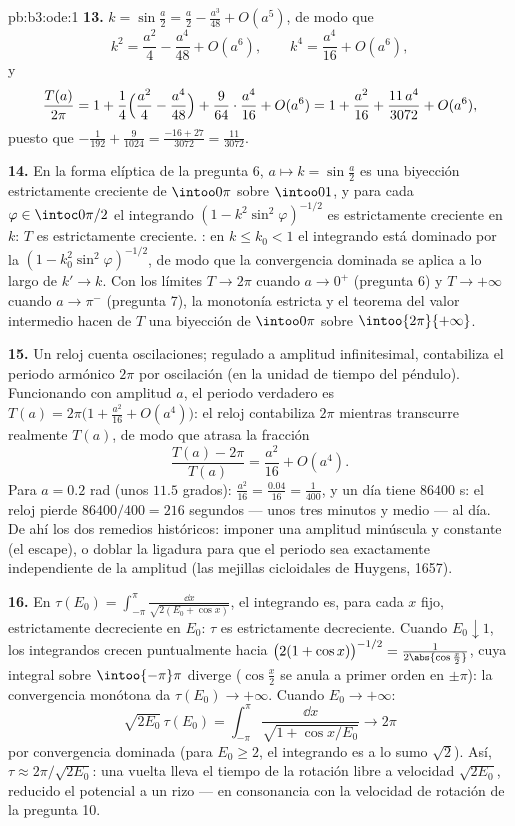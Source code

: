 \begin{solution}{pb:b3:ode:1}
\textbf{13.} $k = \sin\frac a2 = \frac a2 - \frac{a^3}{48} +
O(a^5)$, de modo que
\[
k^2 = \frac{a^2}4 - \frac{a^4}{48} + O(a^6),
\qquad
k^4 = \frac{a^4}{16} + O(a^6) ,
\]
y
\[
\frac{T(a)}{2\pi} = 1 + \frac14\Bigl(\frac{a^2}4 -
\frac{a^4}{48}\Bigr) + \frac9{64}\cdot\frac{a^4}{16} +
O(a^6)
= 1 + \frac{a^2}{16} + \frac{11\,a^4}{3072} + O(a^6) ,
\]
puesto que $-\frac1{192} + \frac9{1024} = \frac{-16 + 27}{3072}
= \frac{11}{3072}$.

\textbf{14.} En la forma elíptica de la pregunta 6, $a \mapsto
k = \sin\frac a2$ es una biyección
 estrictamente creciente de
$\intoo0\pi$ sobre $\intoo01$, y para cada $\varphi \in \intoc0{\pi/2}$
el integrando $(1 -
k^2\sin^2\varphi)^{-1/2}$ es estrictamente creciente en $k$: $T$ es
estrictamente creciente.
: en $k \leq k_0 < 1$ el
integrando está dominado por la
 $(1 -
k_0^2\sin^2\varphi)^{-1/2}$, de modo que la convergencia dominada se
aplica a lo largo de $k' \to k$. Con los límites $T \to 2\pi$ cuando $a
\to 0^+$ (pregunta 6) y $T \to +\infty$ cuando $a \to \pi^-$ (pregunta
7), la monotonía estricta y el teorema del valor intermedio hacen de $T$
una biyección de $\intoo0\pi$ sobre
$\intoo{2\pi}{+\infty}$.

\textbf{15.} Un reloj cuenta oscilaciones; regulado a amplitud
infinitesimal, contabiliza el periodo armónico $2\pi$ por oscilación (en
la unidad de tiempo del péndulo). Funcionando con amplitud $a$, el
periodo verdadero es $T(a) = 2\pi\bigl(1 + \frac{a^2}{16} +
O(a^4)\bigr)$: el reloj contabiliza $2\pi$ mientras transcurre realmente
$T(a)$, de modo que atrasa la fracción
\[
\frac{T(a) - 2\pi}{T(a)} = \frac{a^2}{16} + O(a^4) .
\]
Para $a = 0.2$ rad (unos $11.5$ grados): $\frac{a^2}{16} =
\frac{0.04}{16} = \frac1{400}$, y un día tiene $86400$ s: el reloj
pierde $86400/400 = 216$ segundos --- unos tres minutos y medio --- al
día. De ahí los dos remedios históricos: imponer una amplitud minúscula
y constante (el escape), o doblar la ligadura para que el periodo sea
exactamente independiente de la amplitud (las mejillas cicloidales de
Huygens, 1657).

\textbf{16.} En $\tau(E_0) = \int_{-\pi}^{\pi}\frac{\dd
x}{\sqrt{2(E_0 + \cos x)}}$, el integrando es, para cada $x$ fijo,
estrictamente decreciente en $E_0$: $\tau$ es estrictamente decreciente.
Cuando $E_0 \downarrow 1$, los integrandos crecen puntualmente hacia
$\bigl(2(1 + \cos x)\bigr)^{-1/2} =
\frac1{2\abs{\cos\frac x2}}$, cuya integral sobre $\intoo{-\pi}\pi$
diverge ($\cos\frac x2$ se anula a primer orden en $\pm\pi$): la
convergencia monótona da $\tau(E_0)
\to +\infty$. Cuando $E_0 \to +\infty$:
\[
\sqrt{2E_0}\,\tau(E_0) = \int_{-\pi}^{\pi}
\frac{\dd x}{\sqrt{1 + \cos x/E_0}} \longrightarrow 2\pi
\]
por convergencia dominada (para $E_0 \geq 2$, el integrando es a lo sumo
$\sqrt2$). Así, $\tau \approx 2\pi/\sqrt{2E_0}$: una vuelta lleva el
tiempo de la rotación libre a velocidad $\sqrt{2E_0}$, reducido el
potencial a un rizo --- en consonancia con la velocidad de rotación de
la pregunta 10.


\end{solution}
